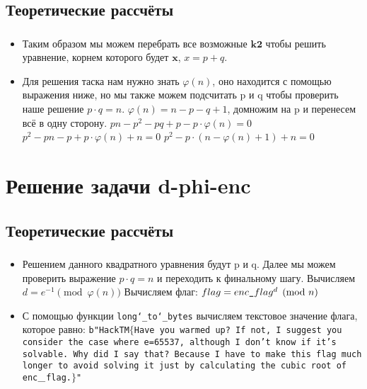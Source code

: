 \documentclass[t]{beamer}
\begin{document}
\subsection{Теоретические рассчёты}
\begin{frame}[t] %
	\frametitle{\insertsection}
	\framesubtitle{\insertsubsection}
        \begin{itemize}
            \item Таким образом мы можем перебрать все возможные $\boldsymbol{k2}$ чтобы решить уравнение, корнем которого будет $\boldsymbol{x}$, $x=p+q$.
            \item Для решения таска нам нужно знать $\varphi(n)$, оно находится с помощью выражения ниже, но мы также можем подсчитать p и q чтобы проверить наше решение $p \cdot q=n$.\newline
            $\varphi(n)=n-p-q+1$, домножим на p и перенесем всё в одну сторону.\newline\newline
            $pn-p^2-pq+p-p \cdot \varphi(n)=0$\newline
            $p^2-pn-p+p \cdot \varphi(n)+n=0$\newline
            $p^2-p \cdot (n-\varphi(n)+1)+n=0$
	\end{itemize}
\end{frame}

\section{Решение задачи d-phi-enc}
\subsection{Теоретические рассчёты}
\begin{frame}[t] %
	\frametitle{\insertsection}
	\framesubtitle{\insertsubsection}
        \begin{itemize}
            \item Решением данного квадратного уравнения будут p и q. Далее мы можем проверить выражение $p \cdot q=n$ и переходить к финальному шагу.\newline
            Вычисляем $d = e^{-1}\pmod{\varphi(n)}$\newline
            Вычисляем флаг: $flag = \texttt{$enc\char`_flag^d \pmod{n}$}$\newline
            \item С помощью функции \texttt{long\char`_to\char`_bytes} вычисляем текстовое значение флага, которое равно:\newline
            \texttt{b"HackTM$\{$Have you warmed up? If not, I suggest you consider the case where e=65537, although I don't know if it's solvable. Why did I say that? Because I have to make this flag much longer to avoid solving it just by calculating the cubic root of enc$\char`_$flag.$\}$"}
	\end{itemize}
\end{frame}
\end{document}

